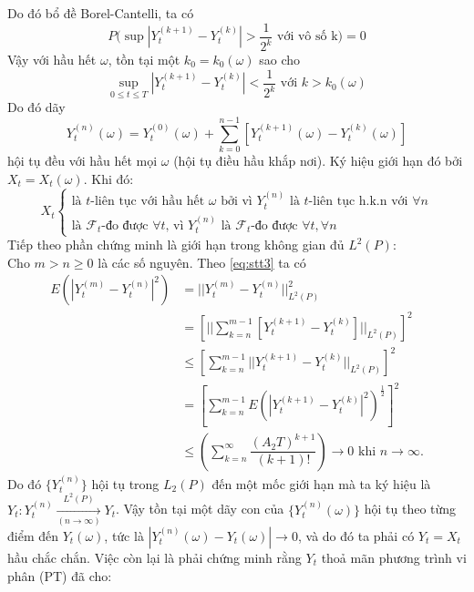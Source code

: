 \documentclass[a4paper]{article}
\numberwithin{equation}{section}
\begin{document}
Do đó bổ đề Borel-Cantelli, ta có
\begin{equation*}
	P(\sup{|Y_t^{(k+1)}-Y_t^{(k)}|}>\dfrac{1}{2^k} \text{ với vô số k)}=0
\end{equation*}
Vậy với hầu hết $\omega$, tồn tại một $k_0=k_0(\omega)$ sao cho
\begin{equation*}
	\sup_{0\leq t\leq T}|Y_t^{(k+1)}-Y_t^{(k)}|<\dfrac{1}{2^k}\text{ với }k>k_0(\omega)
\end{equation*}
Do đó dãy
\begin{equation*}
	Y_t^{(n)}(\omega)=Y_t^{(0)}(\omega)+\sum_{k=0}^{n-1}[Y_t^{(k+1)}(\omega)-Y_t^{(k)}(\omega)]
\end{equation*}
hội tụ đều với hầu hết mọi $\omega$ (hội tụ điều hầu khắp nơi). Ký hiệu giới hạn đó bởi $X_t=X_t(\omega)$. Khi đó:
\begin{equation*}
	X_t\begin{cases}
		\text{là $t$-liên tục với hầu hết $\omega$ bởi vì $Y_t^{(n)}$ là $t$-liên tục h.k.n với $\forall n$}\\
		\text{là $\mathscr{F}_t$-đo được $\forall t$, vì $Y_t^{(n)}$ là $\mathscr{F}_t$-đo được $\forall t,\forall n$}
	\end{cases}
\end{equation*}
Tiếp theo phần chứng minh là giới hạn trong không gian đủ $L^2(P)$:\\
Cho $m>n\geq0$ là các số nguyên. Theo \eqref{eq:stt3} ta có
\begin{equation*}
	\begin{split}
		E(|Y_t^{(m)}-Y_t^{(n)}|^2)&=||Y_t^{(m)}-Y_t^{(n)}||^2_{L^2(P)}\\
		&=\left[||\sum_{k=n}^{m-1}[Y_t^{(k+1)}-Y_t^{(k)}]||_{L^2(P)}\right]^2\\
		&\leq\left[\sum_{k=n}^{m-1}||Y_t^{(k+1)}-Y_t^{(k)}||_{L^2(P)}\right]^2\\
		&=\left[\sum_{k=n}^{m-1}E(|Y_t^{(k+1)}-Y_t^{(k)}|^2)^{\frac{1}{2}}\right]^2\\
		&\leq\left(\sum_{k=n}^{\infty}\dfrac{(A_2T)^{k+1}}{(k+1)!}\right)\longrightarrow0\text{ khi }n\rightarrow\infty.
	\end{split}
\end{equation*}
Do đó $\{Y_t^{(n)}\}$ hội tụ trong $L_2(P)$ đến một mốc giới hạn mà ta ký hiệu là $Y_t:Y_t^{(n)}\xrightarrow [ (n\rightarrow\infty) ]{ L^2(P) }Y_t$. Vậy tồn tại một dãy con của $\{Y_t^{(n)}(\omega)\}$ hội tụ theo từng điểm đến $Y_t(\omega)$, tức là $|Y_t^{(n)}(\omega)-Y_t(\omega)|\rightarrow0$, và do đó ta phải có $Y_t=X_t$ hầu chắc chắn. Việc còn lại là phải chứng minh rằng $Y_t$ thoả mãn phương trình vi phân (PT) đã cho:\\
\end{document}
